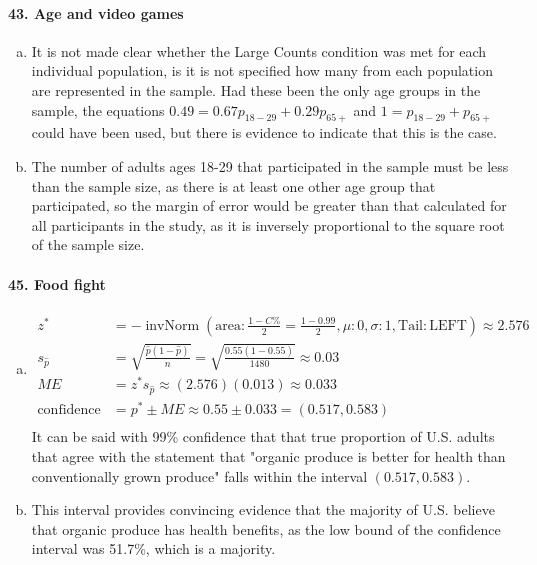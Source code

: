 \documentclass[12pt, A4]{article}
\DeclareMathOperator{\invNorm}{invNorm}
\newcommand{\invNormal}[4]{\invNorm\left(\mathrm{area}:#1, \mu: #2, \sigma: #3, \mathrm{Tail: #4}\right)}
\newcommand{\propse}[2]{\sqrt{\frac{#1\left(1 - #1\right)}{#2}}}
\begin{document}
		\paragraph{43. Age and video games}
			\begin{enumerate}[a.]
				\item
					It is not made clear whether the Large Counts condition was met for each individual population, is it is not specified how many from each population are represented in the sample. Had these been the only age groups in the sample, the equations $0.49 = 0.67p_{18-29} + 0.29p_{65+}$ and $ 1 = p_{18-29} + p_{65+}$ could have been used, but there is evidence to indicate that this is the case.
				\item
					The number of adults ages 18-29 that participated in the sample must be less than the sample size, as there is at least one other age group that participated, so the margin of error would be greater than that calculated for all participants in the study, as it is inversely proportional to the square root of the sample size.
			\end{enumerate}
		\paragraph{45. Food fight}
			\begin{enumerate}[a.]
				\item
					\begin{align*}
						z^* &= -\invNormal{\frac{1 - C\%}{2} = \frac{1 - 0.99}{2}}{0}{1}{LEFT} \approx 2.576 \\
						s_{\hat{p}} &= \propse{\hat{p}}{n} = \propse{0.55}{1480} \approx 0.03 \\
						ME &= z^*s_{\hat{p}} \approx (2.576)(0.013) \approx 0.033 \\
						\text{confidence interval} &= p^* \pm ME \approx 0.55 \pm 0.033 = (0.517, 0.583) \\ 
					\end{align*}
					It can be said with 99\% confidence that that true proportion of U.S. adults that agree with the statement that "organic produce is better for health than conventionally grown produce" falls within the interval $(0.517, 0.583)$.
				\item
					This interval provides convincing evidence that the majority of U.S. believe that organic produce has health benefits, as the low bound of the confidence interval was 51.7\%, which is a majority.
			\end{enumerate}
\end{document}
